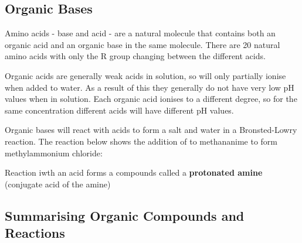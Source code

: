 		\begin{center}
		\end{center}

	\subsection{Organic Bases}
		
		Amino acids - base and acid - are a natural molecule that contains both an organic acid and an organic base in the same molecule. There are 20 natural amino acids with only the R group changing between the different acids.

		\begin{center}
		\end{center}

		Organic acids are generally weak acids in solution, so will only partially ionise when added to water. As a result of this they generally do not have very low pH values when in solution. Each organic acid ionises to a different degree, so for the same concentration different acids will have different pH values.

		Organic bases will react with acids to form a salt and water in a Bronsted-Lowry reaction. The reaction below shows the addition of  to methananime to form methylammonium chloride:

		\begin{center}
		\end{center}

		Reaction iwth an acid forms a compounds called a \textbf{protonated amine} (conjugate acid of the amine)

	\subsection{Summarising Organic Compounds and Reactions}
	
		
